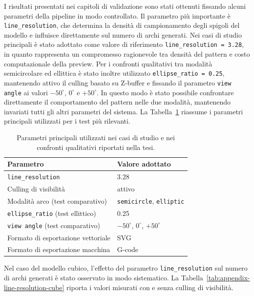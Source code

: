 \documentclass[a4paper,11pt,titlepage,twoside]{book}
\newcommand{\1}{\mathbf{1}}
\numberwithin{equation}{chapter}
\theoremstyle{plain}
\theoremstyle{definition}
\begin{document}
	I risultati presentati nei capitoli di validazione sono stati ottenuti fissando alcuni parametri della pipeline in modo controllato. Il parametro più importante è \texttt{line\_resolution}, che determina la densità di campionamento degli spigoli del modello e influisce direttamente sul numero di archi generati. Nei casi di studio principali è stato adottato come valore di riferimento \texttt{line\_resolution = 3.28}, in quanto rappresenta un compromesso ragionevole tra densità del pattern e costo computazionale della preview.
	Per i confronti qualitativi tra modalità semicircolare ed ellittica è stato inoltre utilizzato \texttt{ellipse\_ratio = 0.25}, mantenendo attivo il culling basato su Z-buffer e fissando il parametro \texttt{view angle} ai valori \(-50^\circ\), \(0^\circ\) e \(+50^\circ\). In questo modo è stato possibile confrontare direttamente il comportamento del pattern nelle due modalità, mantenendo invariati tutti gli altri parametri del sistema.
	La Tabella~\ref{tab:appendix-main-params} riassume i parametri principali utilizzati per i test più rilevanti.
	
	\begin{table}[htbp]
		\centering
		\caption[Parametri principali della pipeline]{Parametri principali utilizzati nei casi di studio e nei confronti qualitativi riportati nella tesi.}
		\label{tab:appendix-main-params}
		\begin{tabular}{ll}
			\toprule
			Parametro & Valore adottato \\
			\midrule
			\texttt{line\_resolution} & 3.28 \\
			Culling di visibilità & attivo \\
			Modalità arco (test comparativo) & \texttt{semicircle}, \texttt{elliptic} \\
			\texttt{ellipse\_ratio} (test ellittico) & 0.25 \\
			\texttt{view angle} (test comparativo) & \(-50^\circ\), \(0^\circ\), \(+50^\circ\) \\
			Formato di esportazione vettoriale & SVG \\
			Formato di esportazione macchina & G-code \\
			\bottomrule
		\end{tabular}
	\end{table}
	
	Nel caso del modello cubico, l’effetto del parametro \texttt{line\_resolution} sul numero di archi generati è stato osservato in modo sistematico. La Tabella~\ref{tab:appendix-line-resolution-cube} riporta i valori misurati con e senza culling di visibilità.
	
\end{document}
